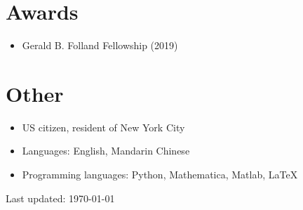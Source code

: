 \documentclass[letterpaper]{article}
\def\footerlink{}
\begin{document}
\section*{Awards} 
\begin{itemize} 
 \item Gerald B. Folland Fellowship (2019)
\end{itemize}


\section*{Other}

\begin{itemize}
	\item US citizen, resident of New York City
	\item Languages: English, Mandarin Chinese 
	\item Programming languages: Python, Mathematica, Matlab, \LaTeX 
\end{itemize}

\bigskip


\begin{center}
  \begin{footnotesize}
    Last updated: \today \\
    \href{\footerlink}{\texttt{\footerlink}}
  \end{footnotesize}
\end{center}
\end{document}
